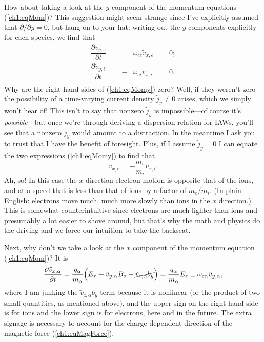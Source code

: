 How about taking a look at the $y$ component of the momentum equations
(\ref{ch1:eqMom})? This suggestion might seem strange since I've explicitly
assumed that $\partial / \partial y = 0$, but hang on to your hat: writing out
the $y$ components explicitly for each species, we find that
\begin{equation} 
  \begin{alignedat}{2}
    \label{ch1:eqMomy} \dfrac{\partial \tilde v_{y,e}}{\partial t} &=
    &\omega_{ce} \tilde v_{x,e} &= 0; \\
    \dfrac{\partial \tilde v_{y,i}}{\partial t} &=
    - &\omega_{ci} \tilde v_{x,i} &= 0. \\
  \end{alignedat}
\end{equation}
Why are the right-hand sides of (\ref{ch1:eqMomy}) zero?  Well, if they weren't
zero the possibility of a time-varying current density $\tilde j_y \neq 0$
arises, which we simply won't hear of! This isn't to say that nonzero
$\tilde j_y$ is impossible---of course it's \emph{possible}---but once we're
through deriving a dispersion relation for IAWs, you'll see that
a nonzero $\tilde j_y$ would amount to a distraction. In the meantime I ask you
to trust that I have the benefit of foresight. Plus, if I assume
$\tilde j_y = 0$ I can equate the two expressions (\ref{ch1:eqMomy}) to find
that
\begin{equation} 
  \tilde v_{x,e} = - \dfrac{m_e}{m_i} \tilde v_{x,i}.
\end{equation}
Ah, so! In this case the $x$ direction electron motion is opposite that of the
ions, and at a speed that is less than that of ions by a factor of $m_e /
m_i$.
(In plain English: electrons move much, much more slowly than ions in the $x$
direction.) This is somewhat counterintuitive since electrons are much lighter
than ions and presumably a lot easier to shove around, but that's why the math
and physics do the driving and we force our intuition to take the backseat.

Next, why don't we take a look at the $x$ component of the momentum equation
(\ref{ch1:eqMom})? It is
\begin{equation} \label{ch1:eqMomx} \dfrac{\partial \tilde v_{x,\alpha}}{\partial t} =
  \dfrac{q_\alpha}{m_\alpha} \Big ( E_x + \tilde v_{y,\alpha} B_o - \cancel{\tilde v_{z,\alpha} b_y}
  \Big ) = \dfrac{q_\alpha}{m_\alpha} E_x \pm \omega_{c \alpha} \tilde v_{y,\alpha},
\end{equation}
where I am junking the $\tilde v_{z,\alpha} b_y$ term because it is nonlinear
(or the product of two small quantities, as mentioned above), and the upper sign
on the right-hand side is for ions and the lower sign is for electrons, here and
in the future. The extra signage is necessary to account for the
charge-dependent direction of the magnetic force (\ref{ch1:eqMagForce}).

